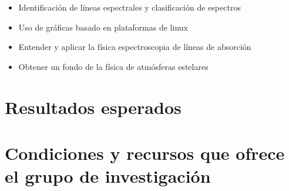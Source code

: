 \documentclass[11pt]{article}
\begin{document}
\begin{itemize}
    \item Identificación de líneas espectrales y clasificación de espectros
    \item Uso de gráficas basado en plataformas de linux
    \item Entender y aplicar la física espectroscopia de líneas de absorción
    \item Obtener un fondo de la física de atmósferas estelares
\end{itemize}

\section{Resultados esperados}

\section{Condiciones y recursos que ofrece el grupo de investigación}

\end{document}
